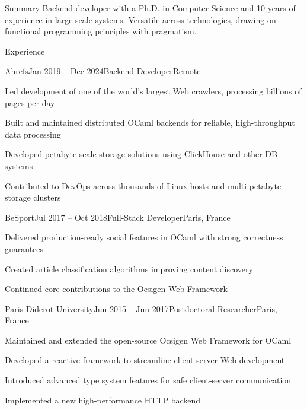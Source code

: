 \documentclass[11pt]{resume}
\begin{document}
\begin{rSection}{Summary}
Backend developer with a Ph.D. in Computer Science and 10 years of
experience in large-scale systems. Versatile across technologies,
drawing on functional programming principles with pragmatism.
\end{rSection}

\begin{rSection}{Experience}

  \begin{rSubsection}{Ahrefs}{Jan 2019 -- Dec 2024}{Backend
      Developer}{Remote}
  \item Led development of one of the world’s largest Web crawlers,
    processing billions of pages per day
  \item Built and maintained distributed OCaml backends for reliable,
    high-throughput data processing
  \item Developed petabyte-scale storage solutions using ClickHouse
    and other DB systems
  \item Contributed to DevOps across thousands of Linux hosts and
    multi-petabyte storage clusters
  \end{rSubsection}

  \begin{rSubsection}{BeSport}{Jul 2017 -- Oct 2018}{Full-Stack
      Developer}{Paris, France}
  \item Delivered production-ready social features in OCaml with
    strong correctness guarantees
  \item Created article classification algorithms improving content
    discovery
  \item Continued core contributions to the Ocsigen Web Framework
  \end{rSubsection}

  \begin{rSubsection}{Paris Diderot University}{Jun 2015 -- Jun
      2017}{Postdoctoral Researcher}{Paris, France}
  \item Maintained and extended the open-source Ocsigen Web Framework
    for OCaml
  \item Developed a reactive framework to streamline client-server Web
    development
  \item Introduced advanced type system features for safe
    client-server communication
  \item Implemented a new high-performance HTTP backend
  \end{rSubsection}

\end{rSection}
\end{document}

